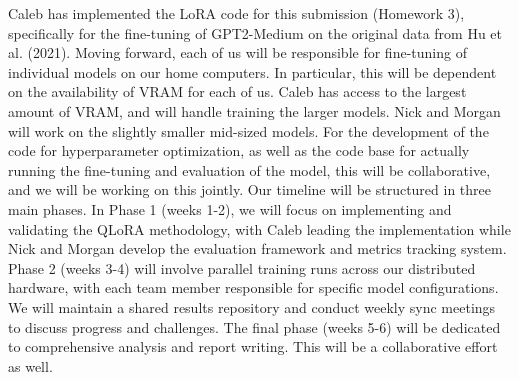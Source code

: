 \documentclass[11pt]{article}
\begin{document}
Caleb has implemented the LoRA code for this submission (Homework 3), specifically for the fine-tuning of GPT2-Medium on the original data from Hu et al. (2021). Moving forward, each of us will be responsible for fine-tuning of individual models on our home computers. In particular, this will be dependent on the availability of VRAM for each of us. Caleb has access to the largest amount of VRAM, and will handle training the larger models. Nick and Morgan will work on the slightly smaller mid-sized models.
For the development of the code for hyperparameter optimization, as well as the code base for actually running the fine-tuning and evaluation of the model, this will be collaborative, and we will be working on this jointly.
Our timeline will be structured in three main phases. In Phase 1 (weeks 1-2), we will focus on implementing and validating the QLoRA methodology, with Caleb leading the implementation while Nick and Morgan develop the evaluation framework and metrics tracking system. Phase 2 (weeks 3-4) will involve parallel training runs across our distributed hardware, with each team member responsible for specific model configurations. We will maintain a shared results repository and conduct weekly sync meetings to discuss progress and challenges. The final phase (weeks 5-6) will be dedicated to comprehensive analysis and report writing. This will be a collaborative effort as well.

\cite{dettmers2023qlora}
\cite{he2022unified}
\cite{hu2021lora}
\cite{li2024instruction}
\cite{liu2024dora}
\cite{novikova2017e2e}



\end{document}
